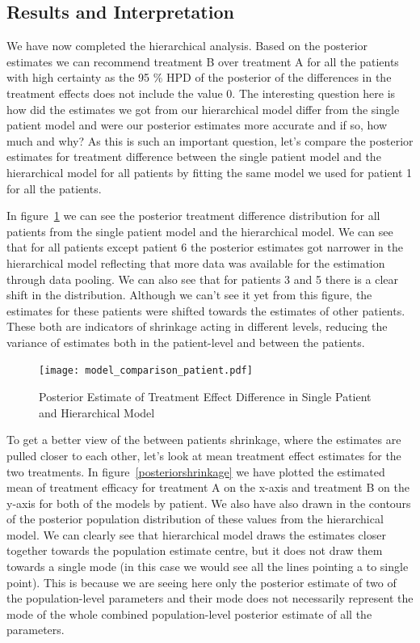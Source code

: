\documentclass[12pt,a4paper,leqno]{report}
\theoremstyle{plain}
\theoremstyle{definition}
\theoremstyle{remark}
\begin{document}
\subsection{Results and Interpretation}

We have now completed the hierarchical analysis. Based on the posterior estimates we can
recommend treatment B over treatment A for all the patients with high certainty
as the 95 \% HPD of the posterior of the differences in the treatment effects does not
include the value 0. The interesting question here is how did the estimates we got from
our hierarchical model differ from the single patient model and were our posterior
estimates more accurate and if so, how much and why? As this is such an important
question, let's compare the posterior estimates for treatment difference between the
single patient model and the hierarchical model for all patients by fitting the same model
we used for patient 1 for all the patients.

In figure\ \ref{modelcomparisonpatient} we can see the posterior treatment difference
distribution for all patients from the single patient model and the hierarchical model.
We can see that for all patients except patient 6 the posterior estimates got narrower
in the hierarchical model reflecting that more data was available for the estimation
through data pooling. We can also see that for patients 3 and 5 there is a clear shift in
the distribution. Although we can't see it yet from this figure, the estimates for these
patients were shifted towards the estimates of other patients. These both are indicators
of shrinkage acting in different levels, reducing the variance of estimates both in the
patient-level and between the patients.

\bigskip
\begin{figure}[H]
    \caption{Posterior Estimate of Treatment Effect Difference in Single Patient and Hierarchical Model}\label{modelcomparisonpatient}
    \bigskip
    \texttt{[image: model\_comparison\_patient.pdf]}
\end{figure}
\bigskip

To get a better view of the between patients shrinkage, where the estimates are pulled
closer to each other, let's look at mean treatment effect estimates for the two treatments.
In figure\ \ref{posteriorshrinkage} we have plotted the estimated mean of
treatment efficacy for treatment A on the x-axis and treatment B on the y-axis for
both of the models by patient. We also have also drawn in the contours of the posterior population
distribution of these values from the hierarchical model. We can clearly see that hierarchical model draws
the estimates closer together towards the population estimate centre, but it does not
draw them towards a single
mode (in this case we would see all the lines pointing a to single point). This is
because we are seeing here only the posterior estimate of two of the population-level
parameters and their mode does not necessarily represent the mode of the whole combined
population-level posterior estimate of all the parameters.
\end{document}

